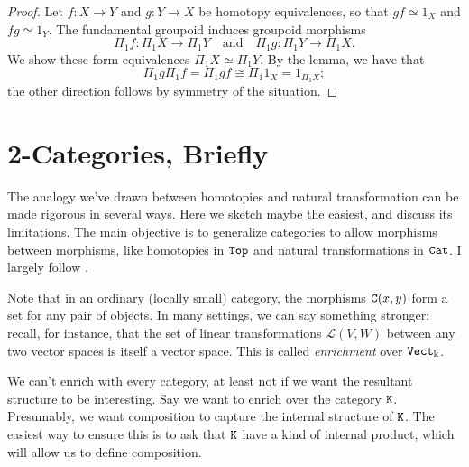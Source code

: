 \documentclass[11 pt]{amsart}
\theoremstyle{plain}   %
\theoremstyle{definition}
\theoremstyle{remark}
\numberwithin{equation}{section}
\def\cL{\mathcal{L}}
\newcommand{\cat}[1]{{\normalfont\texttt{#1}}}
\begin{document}
\begin{proof}
	Let $f: X\rightarrow Y$ and $g: Y\rightarrow X$ be homotopy equivalences, so
	that $gf\simeq 1_X$ and $fg\simeq 1_Y$. The fundamental groupoid induces
	groupoid morphisms $$\Pi_1f: \Pi_1X\rightarrow\Pi_1Y\quad\text{and}\quad\Pi_1g:
		\Pi_1Y\rightarrow\Pi_1X.$$
	We show these form equivalences $\Pi_1X\simeq \Pi_1Y$. By the lemma, we have
	that $$\Pi_1g\Pi_1f = \Pi_1 gf\cong \Pi_1{1_X} = 1_{\Pi_1 X};$$ the other
	direction follows by symmetry of the situation.
\end{proof}

\section{2-Categories, Briefly}
\label{2 categories}

The analogy we've drawn between homotopies and natural transformation can be
made rigorous in several ways. Here we sketch maybe the easiest, and discuss its
limitations. The main objective is to generalize categories to allow morphisms
between morphisms, like homotopies in $\cat{Top}$ and natural transformations in
$\cat{Cat}$. I largely follow \cite[Chapter 1]{Leinster}.

Note that in an ordinary (locally small) category, the morphisms $\cat{C}(x, y)$
form a set for any pair of objects. In many settings, we can say something
stronger: recall, for instance, that the set of linear transformations $\cL(V,
	W)$ between any two vector spaces is itself a vector space. This is called
\emph{enrichment} over $\cat{Vect}_\Bbbk$.

We can't enrich with every category, at least not if we want the resultant
structure to be interesting. Say we want to enrich over the category $\cat{K}$.
Presumably, we want composition to capture the internal structure of $\cat{K}$.
The easiest way to ensure this is to ask that $\cat{K}$ have a kind of internal
product, which will allow us to define composition.
\end{document}
